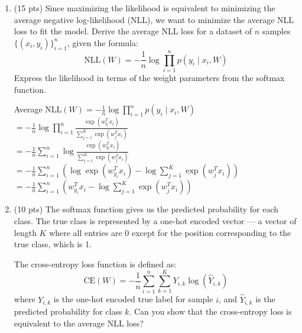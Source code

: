 \documentclass[11pt]{article}
\begin{document}
    \begin{enumerate}

\item (15 pts)
    Since maximizing the likelihood is equivalent to minimizing the average negative log-likelihood (NLL), we want to minimize the average NLL loss to fit the model. Derive the average NLL loss for a dataset of \( n \) samples \( \{(x_i, y_i)\}_{i=1}^n \), given the formula:
    \[
    \mathrm{NLL}(W) = -\frac{1}{n} \log \prod_{i=1}^n p(y_i \mid x_i, W)
    \]
    Express the likelihood in terms of the weight parameters from the softmax function.
    
    
\begin{answertext}{9cm}{}

Average $\mathrm{NLL}(W) = -\frac{1}{n} \log \prod_{i=1}^n p(y_i \mid x_i, W)$\\
$= -\frac{1}{n} \log \prod_{i=1}^{n} \frac{\exp (w_{y_i}^T x_i)}{\sum_{j=1}^K \exp (w_j^T x_i)}$\\
$= -\frac{1}{n} \sum_{i=1}^{n} \log \frac{\exp (w_{y_i}^T x_i)}{\sum_{j=1}^K \exp (w_j^T x_i)}$\\
$= -\frac{1}{n} \sum_{i=1}^{n} (\log \exp (w_{y_i}^T x_i) - \log \sum_{j=1}^K \exp (w_j^T x_i))$\\
$= -\frac{1}{n} \sum_{i=1}^{n} (w_{y_i}^T x_i - \log \sum_{j=1}^{K} \exp (w_j^T x_i))$\\

\end{answertext} 

    \item (10 pts)
    The softmax function gives us the predicted probability for each class. The true class is represented by a one-hot encoded vector — a vector of length \( K \) where all entries are 0 except for the position corresponding to the true class, which is 1. 
    
    The cross-entropy loss function is defined as: \[
\mathrm{CE}(W) = -\frac{1}{n}\sum_{i=1}^n\sum_{k=1}^K Y_{i,k} \log(\hat{Y}_{i,k})
\] where \(Y_{i,k}\) is the one-hot encoded true label for sample \(i\), and \(\hat{Y}_{i,k}\) is the predicted probability for class \(k\). Can you show that the cross-entropy loss is equivalent to the average NLL loss? 

\begin{answertext}{9cm}{}


\end{answertext}
\end{enumerate}
\end{document}
